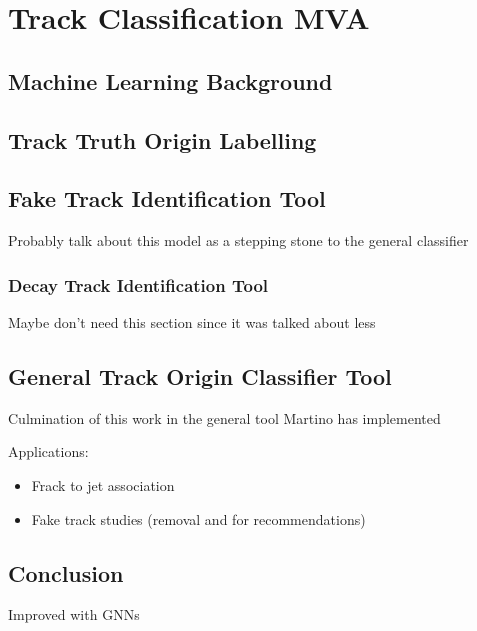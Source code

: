 \chapter{Track Classification MVA}\label{chap:track_classification_mva}


\section{Machine Learning Background}\label{sec:ml_track_classification}
\section{Track Truth Origin Labelling}\label{sec:track_labelling}
\section{Fake Track Identification Tool}\label{sec:fake_track_mva}
Probably talk about this model as a stepping stone to the general classifier

\subsection{\bhadron Decay Track Identification Tool}\label{sec:keep hf mva}
Maybe don't need this section since it was talked about less


\section{General Track Origin Classifier Tool}\label{sec:general_track_classifier}
Culmination of this work in the general tool Martino has implemented

Applications:
\begin{itemize}
    \item Frack to jet association
    \item Fake track studies (removal and for recommendations)
\end{itemize}

\section{Conclusion}

Improved with GNNs
